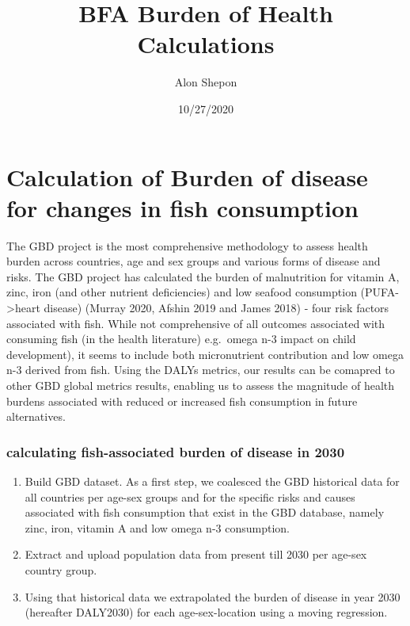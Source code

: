 \documentclass[
]{article}
\title{BFA Burden of Health Calculations}
\author{Alon Shepon}
\date{10/27/2020}
\begin{document}
\maketitle

\hypertarget{calculation-of-burden-of-disease-for-changes-in-fish-consumption}{%
\section{Calculation of Burden of disease for changes in fish
consumption}\label{calculation-of-burden-of-disease-for-changes-in-fish-consumption}}

The GBD project is the most comprehensive methodology to assess health
burden across countries, age and sex groups and various forms of disease
and risks. The GBD project has calculated the burden of malnutrition for
vitamin A, zinc, iron (and other nutrient deficiencies) and low seafood
consumption (PUFA-\textgreater heart disease) (Murray 2020, Afshin 2019
and James 2018) - four risk factors associated with fish. While not
comprehensive of all outcomes associated with consuming fish (in the
health literature) e.g.~omega n-3 impact on child development), it seems
to include both micronutrient contribution and low omega n-3 derived
from fish. Using the DALYs metrics, our results can be comapred to other
GBD global metrics results, enabling us to assess the magnitude of
health burdens associated with reduced or increased fish consumption in
future alternatives.

\hypertarget{calculating-fish-associated-burden-of-disease-in-2030}{%
\subsubsection{calculating fish-associated burden of disease in
2030}\label{calculating-fish-associated-burden-of-disease-in-2030}}

\begin{enumerate}
\def\labelenumi{\arabic{enumi}.}
\item
  Build GBD dataset. As a first step, we coalesced the GBD historical
  data for all countries per age-sex groups and for the specific risks
  and causes associated with fish consumption that exist in the GBD
  database, namely zinc, iron, vitamin A and low omega n-3 consumption.
\item
  Extract and upload population data from present till 2030 per age-sex
  country group.
\item
  Using that historical data we extrapolated the burden of disease in
  year 2030 (hereafter DALY2030) for each age-sex-location using a
  moving regression.
\end{enumerate}
\end{document}
